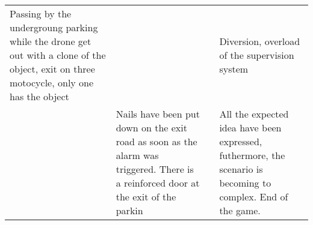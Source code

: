 \documentclass[11pt]{article} %
\begin{document}
\begin{longtable}{|p{3cm}|p{3cm}|p{3cm}|p{3cm}|}
Passing by the undergroung parking while the drone get out with a clone 
of the object, exit on three motocycle, only one has the object & & &
Diversion, overload of the supervision system \\
& Nails have been put down on the exit road as soon as the alarm was triggered.
There is a reinforced door at the exit of the parkin & & All the expected idea have been 
expressed, futhermore, the scenario is becoming to complex. End of the game.
\end{longtable}
\end{document}
